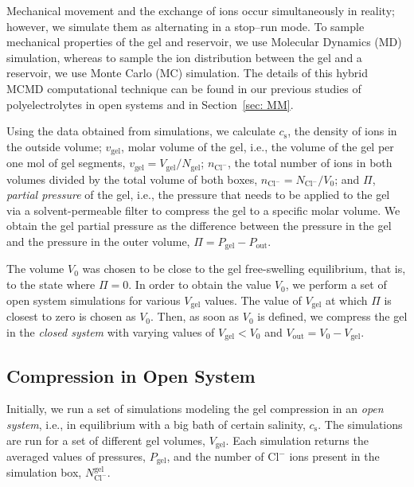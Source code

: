 \documentclass[gels,article,accept,pdftex,moreauthors]{Definitions/mdpi}
\newcommand{\ie}{{i.e.,} }
\newcommand{\ncl}{n_\mathrm{Cl^-}}
\newcommand{\Ncl}{N_\mathrm{Cl^-}}
\newcommand{\gel}{^\mathrm{gel}}
\newcommand{\cl}{\mathrm{Cl^-}}
\newcommand{\cs}{c_{\mathrm{s}}}
\newcommand{\Vgel}{V_\mathrm{gel}}
\newcommand{\vgel}{v_\mathrm{gel}}
\newcommand{\Ngel}{N_\mathrm{gel}}
\newcommand{\Pgel}{\Pi}
\newcommand{\Pout}{P_\mathrm{out}}
\newcommand{\Vout}{V_\mathrm{out}}
\newcommand{\Vbox}{V_0}
\begin{document}
Mechanical movement and the exchange of ions occur simultaneously in reality; however, we simulate them as alternating in a stop--run mode. 
To sample mechanical properties of the gel and reservoir, we use Molecular Dynamics (MD) simulation, whereas to sample the ion distribution between the gel and a reservoir, we use Monte Carlo (MC) simulation.
The details of this hybrid MCMD computational technique can be found in our previous studies of polyelectrolytes in open systems \cite{Rud2020, Rud2022, Landsgesel2020a} and in Section~\ref{sec: MM}. 
 

Using the data obtained from simulations, we calculate  
$\cs$, the density of ions in  the outside volume;
$\vgel$, molar volume of the gel, \ie the volume of the gel per one mol of gel segments, $\vgel = \Vgel / \Ngel$;
$\ncl$, the total number of ions in both volumes divided by the total volume of both boxes, $\ncl = \Ncl/\Vbox$; and
$\Pgel$, \emph{partial pressure} of the gel, \ie the pressure that needs to be applied to the gel via a solvent-permeable filter to compress the gel to a specific molar volume.
We obtain the gel partial pressure as the difference between the pressure in the gel and the pressure in the outer volume, $\Pgel=P_\mathrm{gel} - \Pout$.



The volume $\Vbox$ was chosen to be close to the gel free-swelling equilibrium, that is, to the state where $\Pgel = 0$.
In order to obtain the value $\Vbox$, we perform a set of open system simulations for various $\Vgel$ values.
The value of $\Vgel$ at which $\Pgel$ is closest to zero is chosen as $\Vbox$.
Then, as soon as $\Vbox$ is defined, we compress the gel in the \emph{closed system} with varying values of $\Vgel<\Vbox$ and $\Vout= \Vbox - \Vgel$.



\subsection{Compression in Open System}

Initially, we run a set of simulations modeling the gel compression in an \emph{open system}, \ie in equilibrium with a big bath of certain salinity, $\cs$. 
The simulations are run for a set of different gel volumes, $\Vgel$. 
Each simulation returns the averaged values of pressures, $P_\mathrm{gel}$, and the number of $\cl$ ions present in the simulation box, $\Ncl\gel$. 
\end{document}

